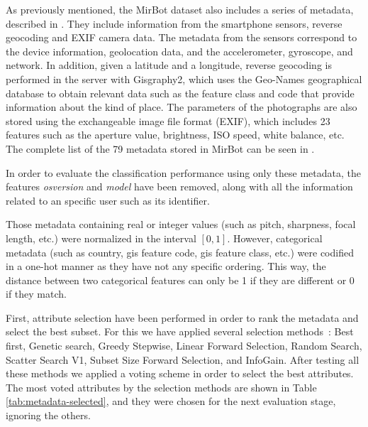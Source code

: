 \documentclass[final, twocolumn]{elsarticle}
\begin{document}
As previously mentioned, the MirBot dataset also includes a series of metadata, described in \cite{MirBot:System}. They include information from the smartphone sensors, reverse geocoding and EXIF camera data.
The metadata from the sensors correspond to the device information, geolocation data, and the accelerometer, gyroscope, and network. In addition, given a latitude and a longitude, reverse geocoding is performed in the server with Gisgraphy2, which uses the Geo-Names geographical database to obtain relevant data such as the feature class and code that provide information about the kind of place. The parameters of the photographs are also stored using the  exchangeable image file format (EXIF), which includes 23 features such as the aperture value, brightness, ISO speed, white balance, etc. The complete list of the 79 metadata stored in MirBot can be seen in \cite{MirBot:System}.

In order to evaluate the classification performance using only these metadata, the features \textit{osversion} and \textit{model} have been removed, along with all the information related to an specific user such as its identifier. 

Those metadata containing real or integer values (such as pitch, sharpness, focal length, etc.) were normalized in the interval $[0,1]$. However, categorical metadata (such as country, gis feature code, gis feature class, etc.) were codified in a one-hot manner as they have not any specific ordering. This way, the distance between two categorical features can only be 1 if they are different or 0 if they match.


First, attribute selection have been performed in order to rank the metadata and select the best subset. For this we have applied several selection methods~\cite{weka}: %
Best first, Genetic search, Greedy Stepwise, Linear Forward Selection, Random Search, Scatter Search V1, Subset Size Forward Selection, and InfoGain. %
%
After testing all these methods we applied a voting scheme in order to select the best attributes. The most voted attributes by the selection methods are shown in Table \ref{tab:metadata-selected}, and they were chosen for the next evaluation stage, ignoring the others. 

\end{document}
